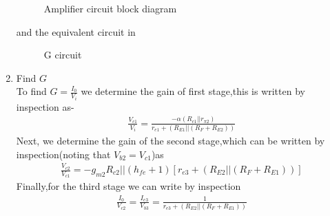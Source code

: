 \begin{enumerate}[label=\thesection.\arabic*.,ref=\thesection.\theenumi]
\begin{figure}[!ht]
\begin{center}
		\resizebox{\columnwidth}{!}{}
	\end{center}
\caption{Amplifier circuit  block diagram}
\label{fig:ee18btech11007_G_blockdiagram}
\end{figure}
and the equivalent circuit in 
 \begin{figure}[!ht]
	\begin{center}
		
		\resizebox{\columnwidth}{!}{}
	\end{center}
\caption{G circuit}
\label{fig:ee18btech11007_circuit3}
\end{figure}





\item Find $G$ 
\\
\solution 
To find $G=\frac{I_0}{V_i}$ we determine the gain of first stage,this is written by inspection as-
\begin{align}
    \frac{V_{c1}}{V_i}=\frac{-\alpha(R_{c1}||r_{\pi2})}{r_{e1}+(R_{E1}||(R_F+R_{E2}))}
\end{align}
%
Next, we determine the gain of the second stage,which can be written by inspection(noting that $V_{b2}=V_{c1}$)as
\begin{align}
    \frac{V_{c2}}{V_{c1}}=-g_{m2}{R_{c2}||(h_{fe}+1)[r_{e3}+(R_{E2}||(R_F+R_{E1}))]}
\end{align}
Finally,for the third stage we can write by inspection
\begin{align}
    \frac{I_0}{V_{c2}}=\frac{I_{e3}}{V_{b3}}=\frac{1}{r_{e3}+(R_{E2}||(R_F+R_{E1}))}
\end{align}


\end{enumerate}
